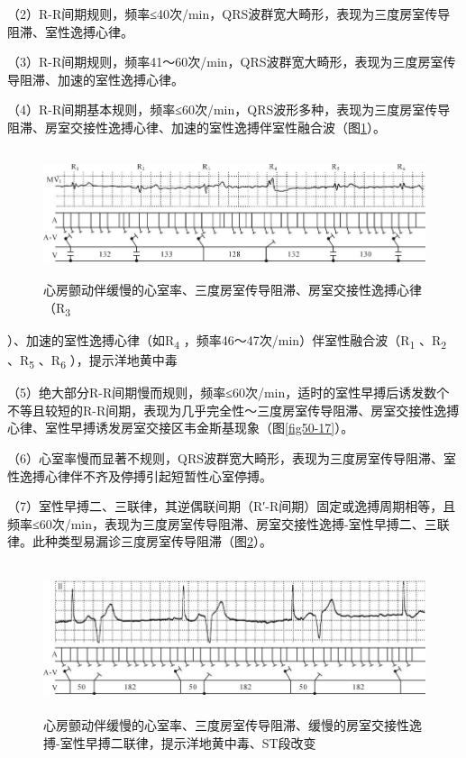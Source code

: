 （2）R-R间期规则，频率≤40次/min，QRS波群宽大畸形，表现为三度房室传导阻滞、室性逸搏心律。

（3）R-R间期规则，频率41～60次/min，QRS波群宽大畸形，表现为三度房室传导阻滞、加速的室性逸搏心律。

（4）R-R间期基本规则，频率≤60次/min，QRS波形多种，表现为三度房室传导阻滞、房室交接性逸搏心律、加速的室性逸搏伴室性融合波（图\ref{fig13-18}）。

\begin{figure}[!htbp]
 \centering
 \includegraphics[width=5.78125in,height=1.47917in]{./images/Image00226.jpg}
 \captionsetup{justification=centering}
 \caption{心房颤动伴缓慢的心室率、三度房室传导阻滞、房室交接性逸搏心律（R\textsubscript{3}}
 \label{fig13-18}
  \end{figure} 
）、加速的室性逸搏心律（如R\textsubscript{4}
，频率46～47次/min）伴室性融合波（R\textsubscript{1}
、R\textsubscript{2} 、R\textsubscript{5} 、R\textsubscript{6}
），提示洋地黄中毒

（5）绝大部分R-R间期慢而规则，频率≤60次/min，适时的室性早搏后诱发数个不等且较短的R-R间期，表现为几乎完全性～三度房室传导阻滞、房室交接性逸搏心律、室性早搏诱发房室交接区韦金斯基现象（图\ref{fig50-17}）。

（6）心室率慢而显著不规则，QRS波群宽大畸形，表现为三度房室传导阻滞、室性逸搏心律伴不齐及停搏引起短暂性心室停搏。

（7）室性早搏二、三联律，其逆偶联间期（R′-R间期）固定或逸搏周期相等，且频率≤60次/min，表现为三度房室传导阻滞、房室交接性逸搏-室性早搏二、三联律。此种类型易漏诊三度房室传导阻滞（图\ref{fig13-19}）。

\begin{figure}[!htbp]
 \centering
 \includegraphics[width=5.77083in,height=1.72917in]{./images/Image00227.jpg}
 \captionsetup{justification=centering}
 \caption{心房颤动伴缓慢的心室率、三度房室传导阻滞、缓慢的房室交接性逸搏-室性早搏二联律，提示洋地黄中毒、ST段改变}
 \label{fig13-19}
  \end{figure} 

